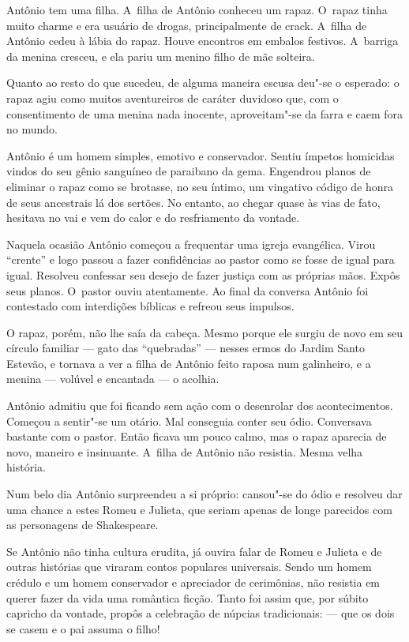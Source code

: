 Antônio tem uma filha. A~filha de Antônio conheceu um rapaz. O~rapaz
tinha muito charme e era usuário de drogas, principalmente de crack. A~filha de Antônio cedeu à lábia do rapaz. Houve encontros em embalos
festivos. A~barriga da menina cresceu, e ela pariu um menino filho de
mãe solteira.

Quanto ao resto do que sucedeu, de alguma maneira escusa deu"-se o
esperado: o rapaz agiu como muitos aventureiros de caráter duvidoso que,
com o consentimento de uma menina nada inocente, aproveitam"-se da farra
e caem fora no mundo.

Antônio é um homem simples, emotivo e conservador. Sentiu ímpetos
homicidas vindos do seu gênio sanguíneo de paraibano da gema. Engendrou
planos de eliminar o rapaz como se brotasse, no seu íntimo, um vingativo
código de honra de seus ancestrais lá dos sertões. No entanto, ao chegar
quase às vias de fato, hesitava no vai e vem do calor e do resfriamento
da vontade.

Naquela ocasião Antônio começou a frequentar uma igreja evangélica.
Virou ``crente'' e logo passou a fazer confidências ao pastor como se
fosse de igual para igual. Resolveu confessar seu desejo de fazer
justiça com as próprias mãos. Expôs seus planos. O~pastor ouviu
atentamente. Ao final da conversa Antônio foi contestado com interdições
bíblicas e refreou seus impulsos.

O rapaz, porém, não lhe saía da cabeça. Mesmo porque ele surgiu de novo
em seu círculo familiar --- gato das ``quebradas'' --- nesses ermos do
Jardim Santo Estevão, e tornava a ver a filha de Antônio feito raposa
num galinheiro, e a menina --- volúvel e encantada --- o acolhia.

Antônio admitiu que foi ficando sem ação com o desenrolar dos
acontecimentos. Começou a sentir"-se um otário. Mal conseguia conter seu
ódio. Conversava bastante com o pastor. Então ficava um pouco calmo, mas
o rapaz aparecia de novo, maneiro e insinuante. A~filha de Antônio não
resistia. Mesma velha história.

Num belo dia Antônio surpreendeu a si próprio: cansou"-se do ódio e
resolveu dar uma chance a estes Romeu e Julieta, que seriam apenas de
longe parecidos com as personagens de Shakespeare.

Se Antônio não tinha cultura erudita, já ouvira falar de Romeu e Julieta
e de outras histórias que viraram contos populares universais. Sendo um
homem crédulo e um homem conservador e apreciador de cerimônias, não
resistia em querer fazer da vida uma romântica ficção. Tanto foi assim
que, por súbito capricho da vontade, propôs a celebração de núpcias
tradicionais: --- que os dois se casem e o pai assuma o filho!

